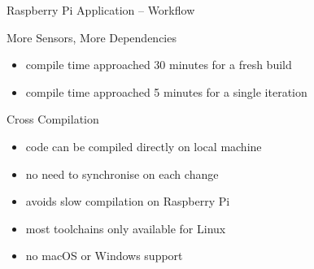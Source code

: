 \begin{frame}{Raspberry Pi Application -- Workflow}
  \begin{block}{More Sensors, More Dependencies}
    \begin{itemize}
      \item compile time approached 30 minutes for a fresh build
      \item compile time approached 5 minutes for a single iteration
    \end{itemize}
  \end{block}

   {
  \begin{block}{ Cross Compilation}
    \begin{itemize}
      \item code can be compiled directly on local machine
      \item no need to synchronise on each change
      \item avoids slow compilation on Raspberry Pi
    \end{itemize}
  \end{block}
  }

   {
  \begin{block}{}
    \begin{itemize}
      \item most toolchains only available for Linux
      \item no macOS or Windows support
    \end{itemize}
  \end{block}
  }
\end{frame}

